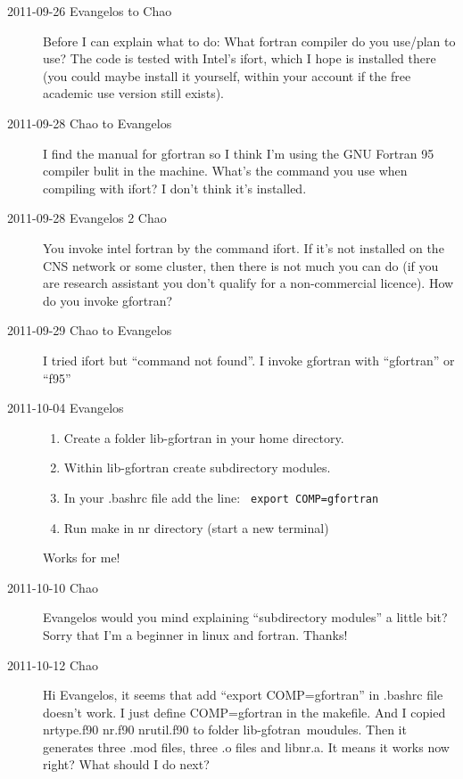 \begin{description}
\item[2011-09-26 Evangelos to Chao] Before I can explain what to do:
What fortran compiler do you use/plan to use?
The code is tested with Intel's ifort, which I hope is installed there (you
could maybe install it yourself, within your account if the free academic use
version still exists).

\item[2011-09-28 Chao to Evangelos]I find the manual for gfortran so I think I'm using the GNU Fortran 95 compiler bulit in the machine. What's the command you use when compiling with ifort? I don't think it's installed.

\item[2011-09-28 Evangelos 2 Chao]You invoke intel fortran by the command ifort. If it's not installed on the CNS network or some cluster, then there is not much you can do
(if you are research assistant you don't qualify for a non-commercial licence). How do you invoke gfortran?

\item[2011-09-29 Chao to Evangelos] I tried ifort but ``command not found''. I invoke gfortran with ``gfortran'' or ``f95''

\item[2011-10-04 Evangelos]
\begin{enumerate}
 \item Create a folder lib-gfortran in your home directory.
 \item Within lib-gfortran create subdirectory modules.
 \item In your .bashrc file add the line:
  \verb| export COMP=gfortran |
 \item Run make in nr directory (start a new terminal)
\end{enumerate}
Works for me!

\item[2011-10-10 Chao]
Evangelos would you mind explaining ``subdirectory modules'' a little bit? Sorry that I'm a beginner in linux and fortran. Thanks!

\item[2011-10-12 Chao]
Hi Evangelos, it seems that add ``export COMP=gfortran'' in .bashrc file doesn't work. I just define COMP=gfortran in the makefile. And I copied nrtype.f90 nr.f90 nrutil.f90 to folder lib-gfotran\ moudules. Then it generates three .mod files, three .o files and libnr.a. It means it works now right? What should I do next?


\end{description}

